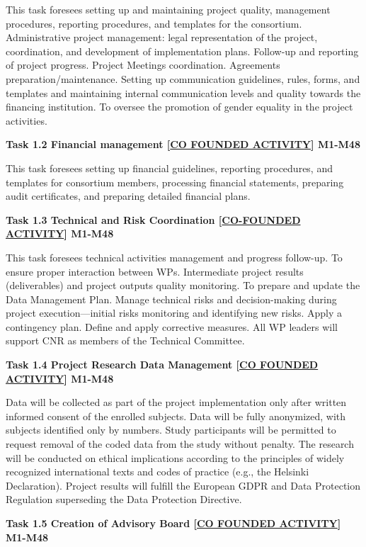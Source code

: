 \begin{longtable}[]
{This task foresees setting up and maintaining project quality,
management procedures, reporting procedures, and templates for the
consortium. Administrative project management: legal representation of
the project, coordination, and development of implementation plans.
Follow-up and reporting of project progress. Project Meetings
coordination. Agreements preparation/maintenance. Setting up
communication guidelines, rules, forms, and templates and maintaining
internal communication levels and quality towards the financing
institution. To oversee the promotion of gender equality in the project
activities.

\textbf{Task 1.2 Financial management {[}\ul{CO FOUNDED ACTIVITY}{]}
M1-M48}

This task foresees setting up financial guidelines, reporting
procedures, and templates for consortium members, processing financial
statements, preparing audit certificates, and preparing detailed
financial plans.

\textbf{Task 1.3 Technical and Risk Coordination {[}\ul{CO-FOUNDED
ACTIVITY}{]} M1-M48}

This task foresees technical activities management and progress
follow-up. To ensure proper interaction between WPs. Intermediate
project results (deliverables) and project outputs quality monitoring.
To prepare and update the Data Management Plan. Manage technical risks
and decision-making during project execution---initial risks monitoring
and identifying new risks. Apply a contingency plan. Define and apply
corrective measures. All WP leaders will support CNR as members of the
Technical Committee.

\textbf{Task 1.4 Project Research Data Management {[}\ul{CO FOUNDED
ACTIVITY}{]} M1-M48}

Data will be collected as part of the project implementation only after
written informed consent of the enrolled subjects. Data will be fully
anonymized, with subjects identified only by numbers. Study participants
will be permitted to request removal of the coded data from the study
without penalty. The research will be conducted on ethical implications
according to the principles of widely recognized international texts and
codes of practice (e.g., the Helsinki Declaration). Project results will
fulfill the European GDPR and Data Protection Regulation superseding the
Data Protection Directive.

\textbf{Task 1.5 Creation of Advisory Board {[}\ul{CO FOUNDED
ACTIVITY}{]} M1-M48}

}
\end{longtable}
